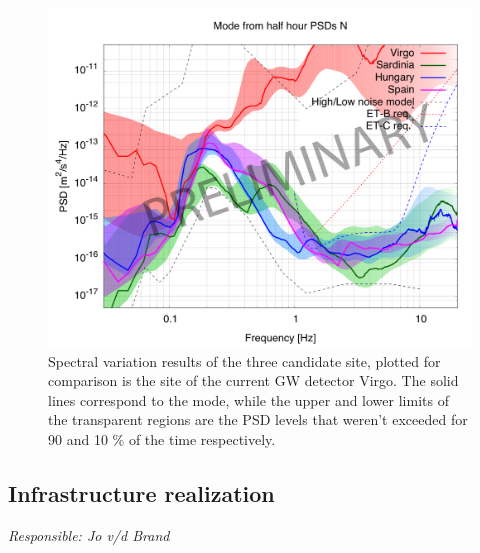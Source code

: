 \begin{figure}[h!]
	\begin{center}
		 \includegraphics[width=14cm]{./Sec_SiteInfra/Figures/BestSiteComparison.png}
		\caption{Spectral variation results of the three candidate site, plotted for comparison is the site of the current GW detector Virgo. The solid lines correspond to the mode, while the upper and lower limits of the transparent regions are the PSD levels that weren't exceeded for 90 and 10 \% of the time respectively. }
		\label{fig:sitecomparison}
	\end{center}
\end{figure}

\FloatBarrier
\subsection{Infrastructure realization}
\emph{
Responsible:  Jo v/d Brand \\
}

